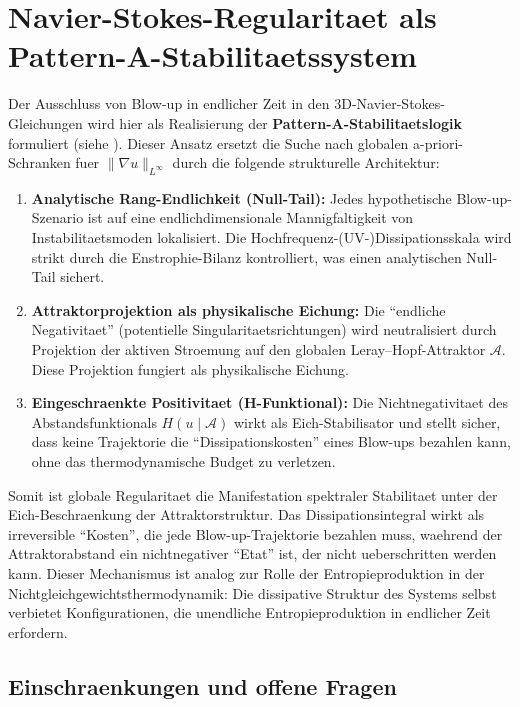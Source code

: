 \documentclass[12pt,a4paper]{article}
\theoremstyle{definition}
\theoremstyle{plain}
\theoremstyle{remark}
\begin{document}
\section{Navier-Stokes-Regularitaet als Pattern-A-Stabilitaetssystem}

Der Ausschluss von Blow-up in endlicher Zeit in den 3D-Navier-Stokes-Gleichungen wird hier als Realisierung der \textbf{Pattern-A-Stabilitaetslogik} formuliert (siehe \cite{FST-Unified2026}). Dieser Ansatz ersetzt die Suche nach globalen a-priori-Schranken fuer $\|\nabla u\|_{L^\infty}$ durch die folgende strukturelle Architektur:

\begin{enumerate}[label=\alph*)]
    \item \textbf{Analytische Rang-Endlichkeit (Null-Tail):} Jedes hypothetische Blow-up-Szenario ist auf eine endlichdimensionale Mannigfaltigkeit von Instabilitaetsmoden lokalisiert. Die Hochfrequenz-(UV-)Dissipationsskala wird strikt durch die Enstrophie-Bilanz \cite{Leray1934} kontrolliert, was einen analytischen Null-Tail sichert.
    \item \textbf{Attraktorprojektion als physikalische Eichung:} Die ``endliche Negativitaet'' (potentielle Singularitaetsrichtungen) wird neutralisiert durch Projektion der aktiven Stroemung auf den globalen Leray--Hopf-Attraktor $\mathcal{A}$. Diese Projektion fungiert als physikalische Eichung.
    \item \textbf{Eingeschraenkte Positivitaet (H-Funktional):} Die Nichtnegativitaet des Abstandsfunktionals $H(u \mid \mathcal{A})$ wirkt als Eich-Stabilisator und stellt sicher, dass keine Trajektorie die ``Dissipationskosten'' eines Blow-ups bezahlen kann, ohne das thermodynamische Budget zu verletzen.
\end{enumerate}

Somit ist globale Regularitaet die Manifestation spektraler Stabilitaet unter der Eich-Beschraenkung der Attraktorstruktur.
Das Dissipationsintegral wirkt als irreversible ``Kosten'', die jede Blow-up-Trajektorie bezahlen muss, waehrend der Attraktorabstand ein nichtnegativer ``Etat'' ist, der nicht ueberschritten werden kann. Dieser Mechanismus ist analog zur Rolle der Entropieproduktion in der Nichtgleichgewichtsthermodynamik: Die dissipative Struktur des Systems selbst verbietet Konfigurationen, die unendliche Entropieproduktion in endlicher Zeit erfordern.

\subsection{Einschraenkungen und offene Fragen}
\end{document}
